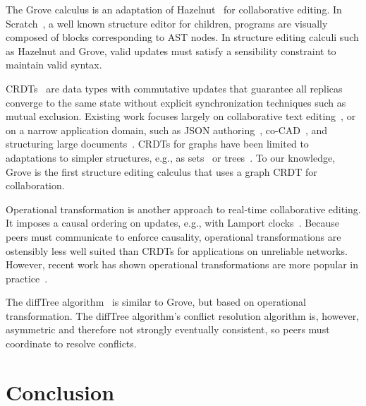 \documentclass[nonacm, acmsmall, screen, review]{acmart}
\begin{document}


The Grove calculus is an adaptation of Hazelnut~\cite{omar_hazelnut_2017} for collaborative editing.
In Scratch~\cite{resnick_scratch_2009}, a well known structure editor for children,
programs are visually composed of blocks corresponding to AST nodes.
In structure editing calculi such as Hazelnut and Grove,
valid updates must satisfy a sensibility constraint to maintain valid syntax.

CRDTs~\cite{shapiro_conflict-free_2011} are data types with commutative updates that guarantee all replicas converge to the same state without explicit synchronization techniques such as mutual exclusion.
Existing work focuses largely on collaborative text editing~\cite{sun_real_2020},
or on a narrow application domain, such as
JSON authoring~\cite{kleppmann_conflict-free_2017},
co-CAD~\cite{lv_novel_2018}, 
and structuring large documents~\cite{hall_causal_2018}.
CRDTs for graphs have been limited to adaptations to simpler structures, e.g., as sets~\cite{shapiro_convergent_2011} or trees~\cite{hall_causal_2018}.
To our knowledge, Grove is the first structure editing calculus that uses a graph CRDT for collaboration.

Operational transformation is another approach to real-time collaborative editing.
It imposes a causal ordering on updates, e.g., with Lamport clocks~\cite{lamport_time_nodate}.
Because peers must communicate to enforce causality,
operational transformations are ostensibly less well suited than CRDTs for applications on unreliable networks.
However, recent work has shown operational transformations are more popular in practice~\cite{sun_real_2020}.

The diffTree algorithm~\cite{mcclurg_difftree_nodate} is similar to Grove, but based on operational transformation.
The diffTree algorithm's conflict resolution algorithm is, however,
asymmetric and therefore not strongly eventually consistent,
so peers must coordinate to resolve conflicts.



\section{Conclusion}
\label{sec:conclusion}
\end{document}
